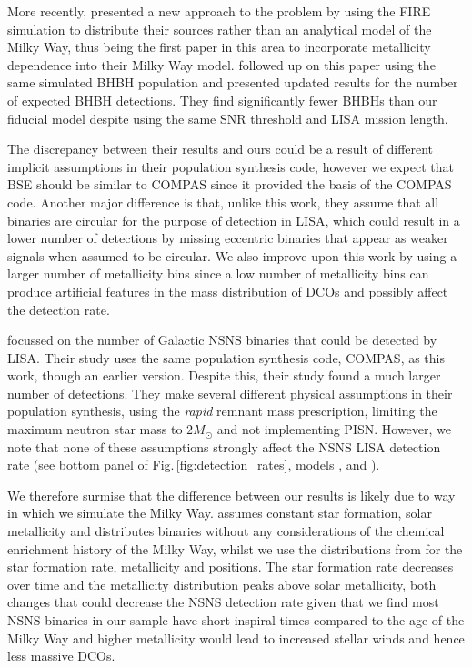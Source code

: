 More recently, \citet{Lamberts+2018} presented a new approach to the problem by using the FIRE simulation \citep{Hopkins+2014} to distribute their sources rather than an analytical model of the Milky Way, thus being the first paper in this area to incorporate metallicity dependence into their Milky Way model. \citet{Sesana+2020} followed up on this paper using the same simulated BHBH population and presented updated results for the number of expected BHBH detections. They find significantly fewer BHBHs than our fiducial model despite using the same SNR threshold and LISA mission length.

The discrepancy between their results and ours could be a result of different implicit assumptions in their population synthesis code, however we expect that BSE should be similar to COMPAS since it provided the basis of the COMPAS code. Another major difference is that, unlike this work, they assume that all binaries are circular for the purpose of detection in LISA, which could result in a lower number of detections by missing eccentric binaries that appear as weaker signals when assumed to be circular. We also improve upon this work by using a larger number of metallicity bins since a low number of metallicity bins can produce artificial features in the mass distribution of DCOs and possibly affect the detection rate.

\citet{Lau+2020} focussed on the number of Galactic NSNS binaries that could be detected by LISA. Their study uses the same population synthesis code, COMPAS, as this work, though an earlier version. Despite this, their study found a much larger number of detections. They make several different physical assumptions in their population synthesis, using the \citet{Fryer+2012} \textit{rapid} remnant mass prescription, limiting the maximum neutron star mass to $2 \unit{M_{\odot}}$ and not implementing PISN. However, we note that none of these assumptions strongly affect the NSNS LISA detection rate (see bottom panel of Fig.\,\ref{fig:detection_rates}, models \modRapid{}, \modNSLow{} and \modNoPISN{}).

We therefore surmise that the difference between our results is likely due to way in which we simulate the Milky Way. \citet{Lau+2020} assumes constant star formation, solar metallicity and distributes binaries without any considerations of the chemical enrichment history of the Milky Way, whilst we use the distributions from \citet{Frankel+2018} for the star formation rate, metallicity and positions. The \citet{Frankel+2018} star formation rate decreases over time and the metallicity distribution peaks above solar metallicity, both changes that could decrease the NSNS detection rate given that we find most NSNS binaries in our sample have short inspiral times compared to the age of the Milky Way and higher metallicity would lead to increased stellar winds and hence less massive DCOs.

